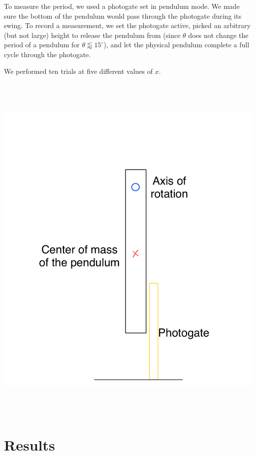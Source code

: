 \documentclass[12pt]{article}
\begin{document}
To measure the period, we used a photogate set in pendulum mode. We made sure the bottom of the pendulum would pass through the photogate during its swing. To record a measurement, we set the photogate active, picked an arbitrary (but not large) height to release the pendulum from (since \(\theta\) does not change the period of a pendulum for \(\theta \lessapprox 15^{\circ}\)), and let the physical pendulum complete a full cycle through the photogate.

We performed ten trials at five different values of \(x\).

\begin{center}
\includegraphics[height=7in]{./setup.png}
\end{center}
\section{Results}
\label{sec:orgff6785a}
\end{document}
